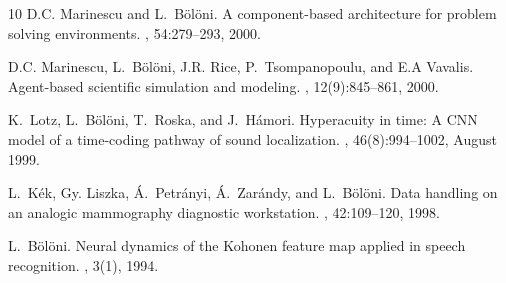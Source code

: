 \begin{thebibliography}{10}
D.C. Marinescu and L.~Bölöni.
\newblock A component-based architecture for problem solving environments.
, 54:279--293, 2000.

D.C. Marinescu, L.~Bölöni, J.R. Rice, P.~Tsompanopoulu, and E.A Vavalis.
\newblock Agent-based scientific simulation and modeling.
, 12(9):845--861, 2000.

K.~Lotz, L.~Bölöni, T.~Roska, and J.~H{\'a}mori.
\newblock Hyperacuity in time: A {CNN} model of a time-coding pathway of sound
  localization.
, 46(8):994--1002,
  August 1999.

L.~K{\'e}k, Gy. Liszka, {\'A}.~Petr{\'a}nyi, {\'A}.~Zar{\'a}ndy, and
  L.~Bölöni.
\newblock Data handling on an analogic mammography diagnostic workstation.
, 42:109--120, 1998.

L.~Bölöni.
\newblock Neural dynamics of the {K}ohonen feature map applied in speech
  recognition.
, 3(1),
  1994.

\end{thebibliography}
